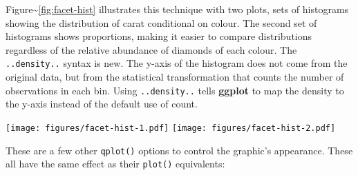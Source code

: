 Figure\textasciitilde{}\ref{fig:facet-hist} illustrates this technique
with two plots, sets of histograms showing the distribution of carat
conditional on colour. The second set of histograms shows proportions,
making it easier to compare distributions regardless of the relative
abundance of diamonds of each colour. The \texttt{..density..} syntax is
new. The y-axis of the histogram does not come from the original data,
but from the statistical transformation that counts the number of
observations in each bin. Using \texttt{..density..} tells
\textbf{ggplot} to map the density to the y-axis instead of the default
use of count.

\begin{Shaded}
\begin{Highlighting}[]
  \StringTok{ }
   \NormalTok{, } \NormalTok{, } \NormalTok{(}\NormalTok{, }\NormalTok{))}
  \StringTok{ }
   \NormalTok{, } \NormalTok{, } \NormalTok{(}\NormalTok{, }\NormalTok{))}
\end{Highlighting}
\end{Shaded}

\texttt{[image: figures/facet-hist-1.pdf]}
\texttt{[image: figures/facet-hist-2.pdf]}


These are a few other \texttt{qplot()} options to control the graphic's
appearance. These all have the same effect as their \texttt{plot()}
equivalents: 

